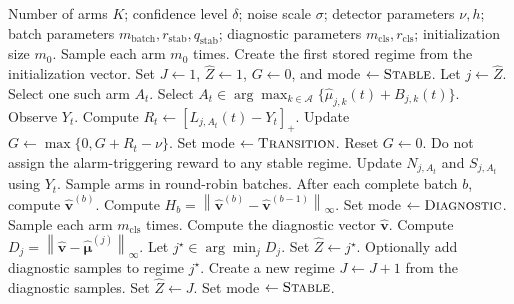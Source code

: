\documentclass[11pt]{article}
\newcommand{\A}{\mathcal A}
\newcommand{\norm}[1]{\left\lVert #1 \right\rVert}
\newcommand{\pos}[1]{\left[#1\right]_{+}}
\begin{document}
\begin{algorithm}[t]
\caption{Transition-Aware Recurrent UCB (TAR-UCB)}
\label{alg:tar_ucb}
\begin{algorithmic}[1]
\Require Number of arms $K$; confidence level $\delta$; noise scale $\sigma$; detector parameters $\nu,h$; batch parameters $m_{\mathrm{batch}},r_{\mathrm{stab}},q_{\mathrm{stab}}$; diagnostic parameters $m_{\mathrm{cls}},r_{\mathrm{cls}}$; initialization size $m_0$.
\State Sample each arm $m_0$ times.
\State Create the first stored regime from the initialization vector.
\State Set $J\gets 1$, $\widehat Z\gets 1$, $G\gets 0$, and mode $\gets\textsc{Stable}$.
        \State Let $j\gets\widehat Z$.
            \State Select one such arm $A_t$.
        \Else
            \State Select $A_t\in\arg\max_{k\in\A}\{\widehat\mu_{j,k}(t)+B_{j,k}(t)\}$.
        \EndIf
        \State Observe $Y_t$.
        \State Compute $R_t\gets\pos{L_{j,A_t}(t)-Y_t}$.
        \State Update $G\gets\max\{0,G+R_t-\nu\}$.
            \State Set mode $\gets\textsc{Transition}$.
            \State Reset $G\gets 0$.
            \State Do not assign the alarm-triggering reward to any stable regime.
        \Else
            \State Update $N_{j,A_t}$ and $S_{j,A_t}$ using $Y_t$.
        \EndIf
        \State Sample arms in round-robin batches.
        \State After each complete batch $b$, compute $\widehat{\bm v}^{(b)}$.
        \State Compute $H_b=\norm{\widehat{\bm v}^{(b)}-\widehat{\bm v}^{(b-1)}}_{\infty}$.
            \State Set mode $\gets\textsc{Diagnostic}$.
        \EndIf
        \State Sample each arm $m_{\mathrm{cls}}$ times.
        \State Compute the diagnostic vector $\widehat{\bm v}$.
            \State Compute $D_j=\norm{\widehat{\bm v}-\widehat{\bm\mu}^{(j)}}_{\infty}$.
        \EndFor
        \State Let $j^\star\in\arg\min_{j}D_j$.
            \State Set $\widehat Z\gets j^\star$.
            \State Optionally add diagnostic samples to regime $j^\star$.
        \Else
            \State Create a new regime $J\gets J+1$ from the diagnostic samples.
            \State Set $\widehat Z\gets J$.
        \EndIf
        \State Set mode $\gets\textsc{Stable}$.
    \EndIf
\EndFor
\end{algorithmic}
\end{algorithm}
\end{document}
